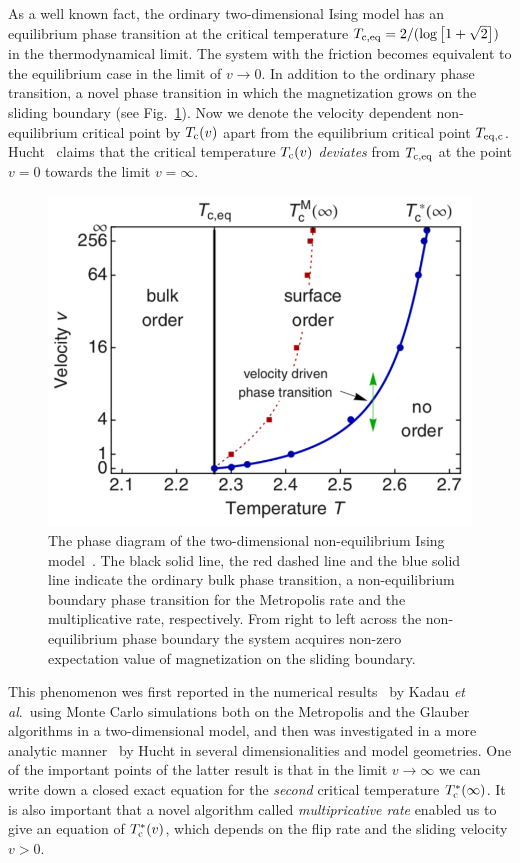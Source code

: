 As a well known fact, the ordinary two-dimensional Ising model has an equilibrium phase transition at the critical temperature $T_{\rm c,eq}=2/(\log\left[1+\sqrt{2}\right])$ in the thermodynamical limit. The system with the friction becomes equivalent to the equilibrium case in the limit of $v\to 0$. In addition to the ordinary phase transition, a novel phase transition in which the magnetization grows on the sliding boundary (see Fig.~\ref{fig:NEPTinIsing}). Now we denote the velocity dependent non-equilibrium critical point by $T_{\rm c}(v)$ apart from the equilibrium critical point $T_{\rm eq, c}$. Hucht~\cite{Hucht2009b} claims that the critical temperature $T_{\rm c}(v)$ \textit{deviates} from $T_{\rm c,eq}$ at the point $v=0$ towards the limit $v=\infty$.

\begin{figure}[htbp]
\centering
\includegraphics[width=0.5\linewidth]{NEPTIsing.pdf}
\caption{The phase diagram of the two-dimensional non-equilibrium Ising model~\cite{Hucht2009b}. The black solid line, the red dashed line and the blue solid line indicate the ordinary bulk phase transition, a non-equilibrium boundary phase transition for the Metropolis rate and the multiplicative rate, respectively. From right to left across the non-equilibrium phase boundary the system acquires non-zero expectation value of magnetization on the sliding boundary.}
\label{fig:NEPTinIsing}
\end{figure}

This phenomenon wes first reported in the numerical results~\cite{Kadau2008} by Kadau \textit{et al}.\ using Monte Carlo simulations both on the Metropolis and the Glauber algorithms in a two-dimensional model, and then was investigated in a more analytic manner~\cite{Hucht2009b} by Hucht in several dimensionalities and model geometries. One of the important points of the latter result is that in the limit $v\to \infty$ we can write down a closed exact equation for the \textit{second} critical temperature $T^{*}_{\rm c}(\infty)$. It is also important that a novel algorithm called \textit{multipricative rate} enabled us to give an equation of $T^{*}_{\rm c}(v)$, which depends on the flip rate and the sliding velocity $v>0$.


